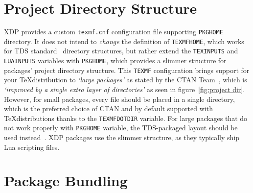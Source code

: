 \documentclass{xdpdoc}
\begin{document}
\begin{multicols}{2}
        \section{Project Directory Structure}\label{sec:pds}

        XDP provides a custom \texttt{texmf.cnf} configuration file supporting \texttt{PKGHOME} directory.
        It does not intend to \textit{change} the definition of \texttt{TEXMFHOME}, which works for TDS standard~\cite{tds} directory structures, but rather extend the \texttt{TEXINPUTS} and \texttt{LUAINPUTS} variables with \texttt{PKGHOME}, which provides a slimmer structure for packages' project directory structure.
        This \texttt{TEXMF} configuration brings support for your \TeX distribution to \textit{`large packages'} as stated by the CTAN Team~\cite{ctan:help:upload}, which is \textit{`improved by a single extra layer of directories'} as seen in figure~\ref{fig:project dir}.
        However, for small packages, every file should be placed in a single directory, which is the preferred choice of CTAN and by default supported with \TeX distributions thanks to the \texttt{TEXMFDOTDIR} variable.
        For large packages that do not work properly with \texttt{PKGHOME} variable, the TDS-packaged layout should be used instead~\cite{ctan:help:tds}.
        XDP packages use the slimmer structure, as they typically ship Lua scripting files.

        \columnbreak
        \label{fig:project dir}


        \section{Package Bundling}\label{sec:bundling}


\end{multicols}
\end{document}
